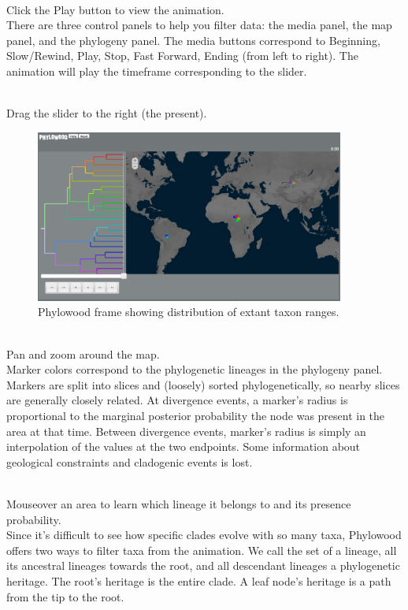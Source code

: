 \noindent \\ \impmark Click the Play button to view the animation. \\

There are three control panels to help you filter data: the media panel, the map panel, and the phylogeny panel.
The media buttons correspond to Beginning, Slow/Rewind, Play, Stop, Fast Forward, Ending (from left to right).
The animation will play the timeframe corresponding to the slider.

\noindent \\ \impmark Drag the slider to the right (the present).

\begin{figure}[H]
\centering
\includegraphics[width=4in]{figures/bg_1_tips}
\caption{Phylowood frame showing distribution of extant taxon ranges.}
\end{figure}

\noindent \\ \impmark Pan and zoom around the map.\\

Marker colors correspond to the phylogenetic lineages in the phylogeny panel.
Markers are split into slices and (loosely) sorted phylogenetically, so nearby slices are generally closely related.
At divergence events, a marker's radius is proportional to the marginal posterior probability the node was present in the area at that time.
Between divergence events, marker's radius is simply an interpolation of the values at the two endpoints.
Some information about geological constraints and cladogenic events is lost.

\noindent \\ \impmark Mouseover an area to learn which lineage it belongs to and its presence probability. \\

Since it's difficult to see how specific clades evolve with so many taxa, Phylowood offers two ways to filter taxa from the animation.
We call the set of a lineage, all its ancestral lineages towards the root, and all descendant lineages a phylogenetic heritage.
The root's heritage is the entire clade.
A leaf node's heritage is a path from the tip to the root.

